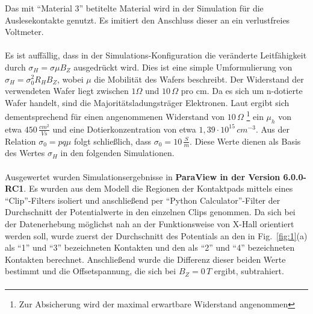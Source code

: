 \documentclass[12pt, a4paper]{article}
\begin{document}
Das mit ``Material 3'' betitelte Material wird in der Simulation für die Auslesekontakte genutzt. Es imitiert den Anschluss dieser an ein verlustfreies Voltmeter.\paragraph{}
Es ist auffällig, dass in der Simulations-Konfiguration die veränderte Leitfähigkeit durch $\sigma_H=\sigma\mu{B_Z}$ ausgedrückt wird. Dies ist eine simple Umformulierung von $\sigma_H=\sigma_0^2R_HB_Z$, wobei $\mu$ die Mobilität des Wafers beschreibt.\newline
Der Widerstand der verwendeten Wafer liegt zwischen $1\Omega$ und $10\,\Omega$ pro cm. Da es sich um n-dotierte Wafer handelt, sind die Majoritätsladungsträger Elektronen. Laut \cite{bowdenDopes} ergibt sich dementsprechend für einen angenommenen Widerstand von $10\,\Omega$ \footnote{Zur Absicherung wird der maximal erwartbare Widerstand angenommen} ein $\mu_h$ von etwa $450\,\frac{cm^2}{Vs}$ und eine Dotierkonzentration von etwa $1,39\cdot10^{15}\,cm^{-3}$. Aus der Relation $\sigma_0=pq\mu$ folgt schließlich, dass $\sigma_0=10\,\frac{S}{m}$. Diese Werte dienen als Basis des Wertes $\sigma_H$ in den folgenden Simulationen.\paragraph{}
Ausgewertet wurden Simulationsergebnisse in \textbf{ParaView in der Version 6.0.0-RC1}. Es wurden aus dem Modell die Regionen der Kontaktpads mittels eines ``Clip''-Filters isoliert und anschließend per ``Python Calculator''-Filter der Durchschnitt der Potentialwerte in den einzelnen Clips genommen.\newline
Da sich bei der Datenerhebung möglichst nah an der Funktionsweise von X-Hall orientiert werden soll, wurde zuerst der Durchschnitt des Potentials an den in Fig.~\ref{fig:1}(a) als ``1'' und ``3'' bezeichneten Kontakten und den als ``2'' und ``4'' bezeichneten Kontakten berechnet. Anschließend wurde die Differenz dieser beiden Werte bestimmt und die Offsetspannung, die sich bei $B_Z=0\,T$ ergibt, subtrahiert.\paragraph{}
\end{document}
